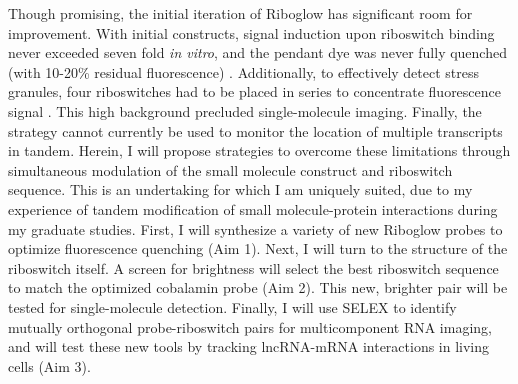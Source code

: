 Though promising, the initial iteration of Riboglow has significant room for improvement. With initial constructs, signal induction upon riboswitch binding never exceeded seven fold \textit{in vitro}, and the pendant dye was never fully quenched (with 10-20\% residual fluorescence) \cite{BraselmannDevelopmentriboswitchbasedplatform2017}. Additionally, to effectively detect stress granules, four riboswitches had to be placed in series to concentrate fluorescence signal \cite{BraselmannDevelopmentriboswitchbasedplatform2017}. This high background precluded single-molecule imaging. Finally, the strategy cannot currently be used to monitor the location of multiple transcripts in tandem. Herein, I will propose strategies to overcome these limitations through simultaneous modulation of the small molecule construct and riboswitch sequence. This is an undertaking for which I am uniquely suited, due to my experience of tandem modification of small molecule-protein interactions during my graduate studies. First, I will synthesize a variety of new Riboglow probes to optimize fluorescence quenching (Aim 1). Next, I will turn to the structure of the riboswitch itself. A screen for brightness will select the best riboswitch sequence to match the optimized cobalamin probe (Aim 2). This new, brighter pair will be tested for single-molecule detection. Finally, I will use SELEX to identify mutually orthogonal probe-riboswitch pairs for multicomponent RNA imaging, and will test these new tools by tracking lncRNA-mRNA interactions in living cells (Aim 3).


